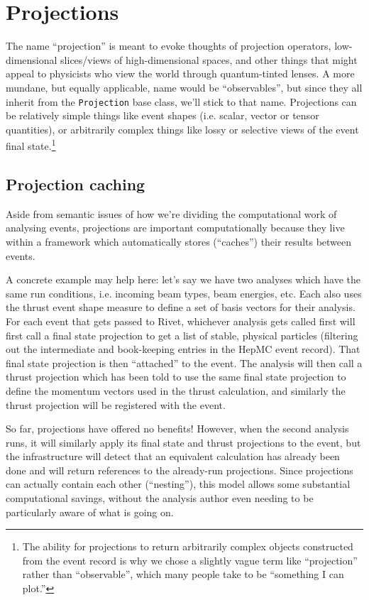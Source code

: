 \documentclass{JHEP3}
\newcommand{\kbd}[1]{\texttt{#1}\xspace}
\begin{document}
\section{Projections}
The name ``projection'' is meant to evoke thoughts of
projection operators, low-dimensional slices/views of high-dimensional spaces,
and other things that might appeal to physicists who view the world through
quantum-tinted lenses. A more mundane, but equally applicable, name would be
``observables'', but since they all inherit from the \kbd{Projection} base
class, we'll stick to that name. Projections can be relatively simple things
like event shapes (i.e. scalar, vector or tensor quantities), or arbitrarily
complex things like lossy or selective views of the event final
state.\footnote{The ability for projections to return arbitrarily complex objects
  constructed from the event record is why we chose a slightly vague term like
  ``projection'' rather than ``observable'', which many people take to be
  ``something I can plot.''}

\subsection{Projection caching}
Aside from semantic issues of how we're dividing the computational work of
analysing events, projections are important computationally because they live
within a framework which automatically stores (``caches'') their results between
events.

A concrete example may help here: let's say we have two analyses which
have the same run conditions, i.e. incoming beam types, beam energies, etc. Each
also uses the thrust event shape measure to define a set of basis vectors for
their analysis. For each event that gets passed to Rivet, whichever analysis
gets called first will first call a final state projection to get a list of
stable, physical particles (filtering out the intermediate and book-keeping
entries in the HepMC event record). That final state projection is then
``attached'' to the event. The analysis will then call a thrust projection which
has been told to use the same final state projection to define the momentum
vectors used in the thrust calculation, and similarly the thrust projection will
be registered with the event.

So far, projections have offered no benefits! However, when the second analysis
runs, it will similarly apply its final state and thrust projections to the
event, but the infrastructure will detect that an equivalent calculation has
already been done and will return references to the already-run
projections. Since projections can actually contain each other (``nesting''),
this model allows some substantial computational savings, without the analysis
author even needing to be particularly aware of what is going on.
\end{document}
